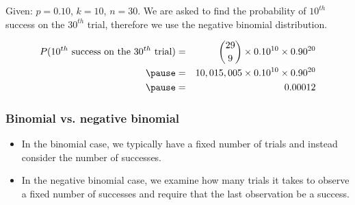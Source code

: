 \begin{frame}


\pause

Given: $p = 0.10$, $k = 10$, $n = 30$. We are asked to find the probability of $10^{th}$ success on the $30^{th}$ trial, therefore we use the negative binomial distribution.

\pause

\begin{eqnarray*}
P(\text{$10^{th}$ success on the $30^{th}$ trial}) &=& {29 \choose 9} \times 0.10^{10} \times 0.90^{20} \\
\pause
&=& 10,015,005 \times 0.10^{10} \times 0.90^{20} \\
\pause
&=& 0.00012
\end{eqnarray*}

\end{frame}


\begin{frame}
\frametitle{Binomial vs. negative binomial}


\pause

\begin{itemize}

\item In the binomial case, we typically have a fixed number of trials and instead consider the number of successes. 

\item In the negative binomial case, we examine how many trials it takes to observe a fixed number of successes and require that the last observation be a success.

\end{itemize}

\end{frame}


